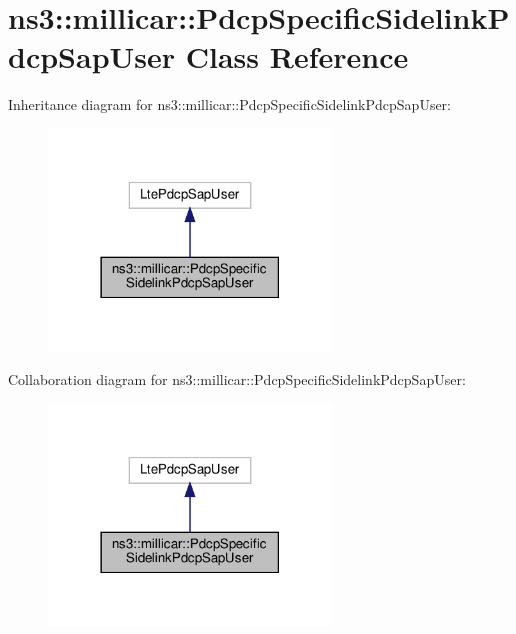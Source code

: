 \hypertarget{classns3_1_1millicar_1_1PdcpSpecificSidelinkPdcpSapUser}{}\section{ns3\+:\+:millicar\+:\+:Pdcp\+Specific\+Sidelink\+Pdcp\+Sap\+User Class Reference}
\label{classns3_1_1millicar_1_1PdcpSpecificSidelinkPdcpSapUser}


Inheritance diagram for ns3\+:\+:millicar\+:\+:Pdcp\+Specific\+Sidelink\+Pdcp\+Sap\+User\+:\nopagebreak
\begin{figure}[H]
\begin{center}
\leavevmode
\includegraphics[width=213pt]{classns3_1_1millicar_1_1PdcpSpecificSidelinkPdcpSapUser__inherit__graph}
\end{center}
\end{figure}


Collaboration diagram for ns3\+:\+:millicar\+:\+:Pdcp\+Specific\+Sidelink\+Pdcp\+Sap\+User\+:\nopagebreak
\begin{figure}[H]
\begin{center}
\leavevmode
\includegraphics[width=213pt]{classns3_1_1millicar_1_1PdcpSpecificSidelinkPdcpSapUser__coll__graph}
\end{center}
\end{figure}
